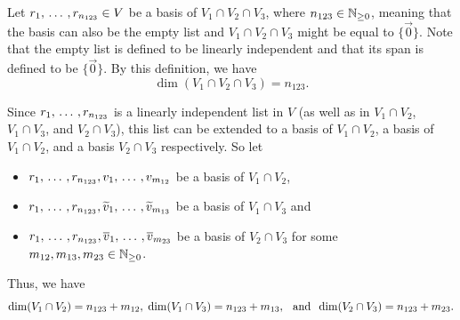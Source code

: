 \begin{failedattempt}
  Let $r_1, {\, \ldots \,\,}, r_{n_{123}} \in V$ be a basis of $V_1 \cap V_2 \cap V_3$, where $n_{123} \in \mathbb{N}_{\geq 0}$, meaning that the basis can also be the empty list and $V_1 \cap V_2 \cap V_3$ might be equal to $\{\vec 0\}$. Note that the empty list is defined to be linearly independent and that its span is defined to be $\{\vec 0\}$. By this definition, we have
  \begin{equation}
    \label{eq: dim for V_1 cap V_2 cap V_3}
    \dim (V_1 \cap V_2 \cap V_3) = n_{123}.
  \end{equation}

  Since $r_1, {\, \ldots \,\,}, r_{n_{123}}$ is a linearly independent list in $V$ (as well as in $V_1 \cap V_2$, $V_1 \cap V_3$, and $V_2 \cap V_3$), this list can be extended to a basis of $V_1 \cap V_2$, a basis of $V_1 \cap V_2$, and a basis $V_2 \cap V_3$ respectively. So let
  \begin{itemize}
    \item $r_1, {\, \ldots \,\,}, r_{n_{123}}, v_1, {\, \ldots \,\,}, v_{m_{12}}$ be a basis of $V_1 \cap V_2$,
    \item $r_1, {\, \ldots \,\,}, r_{n_{123}}, \widetilde{v}_1, {\, \ldots \,\,}, \widetilde{v}_{m_{13}}$ be a basis of $V_1 \cap V_3$ and
    \item $r_1, {\, \ldots \,\,}, r_{n_{123}}, \overline{v}_1, {\, \ldots \,\,}, \overline{v}_{m_{23}}$ be a basis of $V_2 \cap V_3$ for some $m_{12}, m_{13}, m_{23} \in \mathbb{N}_{\geq 0}$.
  \end{itemize}

  Thus, we have
  \begin{equation}
    \label{eq: dim for V_1 cap V_2, V_1 cap V_3, V_2 cap V_3}
    \dim (V_1 \cap V_2) = n_{123} + m_{12}, \; \dim (V_1 \cap V_3) = n_{123} + m_{13}, \;\;\, \text{and}\;\; \dim (V_2 \cap V_3) = n_{123} + m_{23}.
  \end{equation}


\end{failedattempt}
